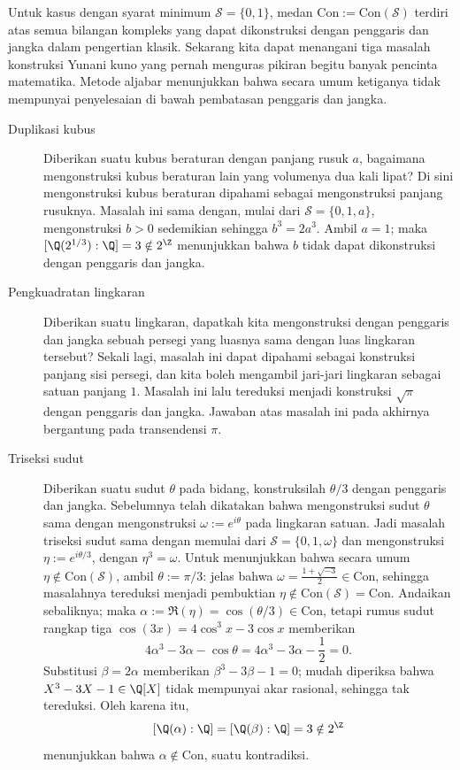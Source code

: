 Untuk kasus dengan syarat minimum $\mathcal{S} = \{0,1\}$, medan $\text{Con} := \text{Con}(\mathcal{S})$ terdiri atas semua bilangan kompleks yang dapat dikonstruksi dengan penggaris dan jangka dalam pengertian klasik. Sekarang kita dapat menangani tiga masalah konstruksi Yunani kuno yang pernah menguras pikiran begitu banyak pencinta matematika. Metode aljabar menunjukkan bahwa secara umum ketiganya tidak mempunyai penyelesaian di bawah pembatasan penggaris dan jangka.
\begin{description}
	\item[Duplikasi kubus] Diberikan suatu kubus beraturan dengan panjang rusuk $a$, bagaimana mengonstruksi kubus beraturan lain yang volumenya dua kali lipat? Di sini mengonstruksi kubus beraturan dipahami sebagai mengonstruksi panjang rusuknya. Masalah ini sama dengan, mulai dari $\mathcal{S} = \{0, 1, a\}$, mengonstruksi $b > 0$ sedemikian sehingga $b^3 = 2a^3$. Ambil $a=1$; maka $[\Q(2^{1/3}):\Q] = 3 \notin 2^{\Z}$ menunjukkan bahwa $b$ tidak dapat dikonstruksi dengan penggaris dan jangka.
	
	\item[Pengkuadratan lingkaran] Diberikan suatu lingkaran, dapatkah kita mengonstruksi dengan penggaris dan jangka sebuah persegi yang luasnya sama dengan luas lingkaran tersebut? Sekali lagi, masalah ini dapat dipahami sebagai konstruksi panjang sisi persegi, dan kita boleh mengambil jari-jari lingkaran sebagai satuan panjang $1$. Masalah ini lalu tereduksi menjadi konstruksi $\sqrt{\pi}$ dengan penggaris dan jangka. Jawaban atas masalah ini pada akhirnya bergantung pada transendensi $\pi$.

	\item[Triseksi sudut] Diberikan suatu sudut $\theta$ pada bidang, konstruksilah $\theta/3$ dengan penggaris dan jangka. Sebelumnya telah dikatakan bahwa mengonstruksi sudut $\theta$ sama dengan mengonstruksi $\omega := e^{i\theta}$ pada lingkaran satuan. Jadi masalah triseksi sudut sama dengan memulai dari $\mathcal{S} = \{0,1,\omega\}$ dan mengonstruksi $\eta := e^{i\theta/3}$, dengan $\eta^3 = \omega$. Untuk menunjukkan bahwa secara umum $\eta \notin \text{Con}(\mathcal{S})$, ambil $\theta := \pi/3$: jelas bahwa $\omega = \frac{1 + \sqrt{-3}}{2} \in \text{Con}$, sehingga masalahnya tereduksi menjadi pembuktian $\eta \notin \text{Con}(\mathcal{S}) = \text{Con}$. Andaikan sebaliknya; maka $\alpha := \Re(\eta) = \cos(\theta/3) \in \text{Con}$, tetapi rumus sudut rangkap tiga $\cos(3x) = 4 \cos^3 x - 3\cos x$ memberikan
	\[ 4\alpha^3 - 3\alpha - \cos\theta = 4\alpha^3 - 3\alpha - \frac{1}{2} = 0. \]
	Substitusi $\beta = 2\alpha$ memberikan $\beta^3 - 3\beta - 1 = 0$; mudah diperiksa bahwa $X^3 - 3X - 1 \in \Q[X]$ tidak mempunyai akar rasional, sehingga tak tereduksi. Oleh karena itu,
	\[ [\Q(\alpha):\Q] = [\Q(\beta) : \Q] = 3 \notin 2^{\Z} \]
	menunjukkan bahwa $\alpha \notin \text{Con}$, suatu kontradiksi.
\end{description}

